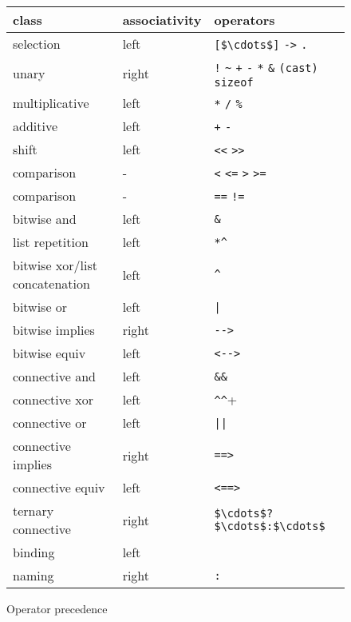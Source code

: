 \begin{figure}[htp]
  \begin{center}
    \begin{tabular}{|l|l|l|}
      \hline
      class 	& associativity & operators \\
      \hline
      selection & left & \lstinline|[$\cdots$]| \lstinline|->| \lstinline|.| \\
      unary 	& right & \lstinline|!| \lstinline|~| \lstinline|+|
      \lstinline|-| \lstinline|*| \lstinline|&| \lstinline|(cast)|
      \lstinline|sizeof| \\
      multiplicative & left & \lstinline|*| \lstinline|/|  \lstinline|%| \\
      additive & left & \lstinline|+| \lstinline|-| \\
      shift 	& left & \lstinline|<<| \lstinline|>>| \\
      comparison & - & \lstinline|<| \lstinline|<=| \lstinline|>| \lstinline|>=| \\
      comparison & - & \lstinline|==| \lstinline|!=| \\
      bitwise and & left & \lstinline|&| \\
      list repetition & left & \lstinline|*^| \\
      bitwise xor/list concatenation & left & \lstinline|^| \\
      bitwise or & left & \lstinline+|+ \\
      bitwise implies & right & \lstinline+-->+ \\
      bitwise equiv & left & \lstinline+<-->+ \\
      connective and & left & \lstinline|&&| \\
      connective xor & left & \lstinline+^^+ \\
      connective or & left & \lstinline+||+ \\
      connective implies & right & \lstinline|==>| \\
      connective equiv & left & \lstinline|<==>| \\
      ternary connective & right & \lstinline|$\cdots$?$\cdots$:$\cdots$| \\
      binding & left & \Forall{} \Exists{} \Let{} \\
      naming & right & \lstinline|:| \\
      \hline
    \end{tabular}
  \end{center}
  \caption{Operator precedence}
\label{fig:precedence}
\end{figure}

